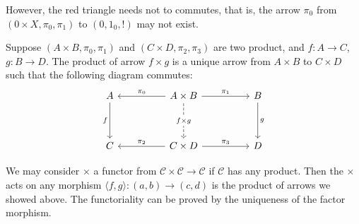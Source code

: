 \documentclass[./main.tex]{subfiles}
\begin{document}
However, the red triangle needs not to commutes, that is,
the arrow $\pi_0$ from $(0 \times X, \pi_0, \pi_1)$ to $(0, 1_0, !)$
may not exist.

\begin{definition}
  Suppose $(A \times B, \pi_0, \pi_1)$ and $(C \times D, \pi_2, \pi_3)$ are two product, and
  $f : A \rightarrow C$, $g : B \rightarrow D$.
  The product of arrow $f \times g$ is a unique arrow from $A \times B$ to $C \times D$
  such that the following diagram commutes:
  \[\begin{tikzcd}
	A && {A \times B} && B \\
	\\
	C && {C \times D} && D
	\arrow["f"', from=1-1, to=3-1]
	\arrow["{\pi_0}"', from=1-3, to=1-1]
	\arrow["{\pi_1}", from=1-3, to=1-5]
	\arrow["{f \times g}"{description}, dashed, from=1-3, to=3-3]
	\arrow["g", from=1-5, to=3-5]
	\arrow["{\pi_2}"', from=3-3, to=3-1]
	\arrow["{\pi_3}", from=3-3, to=3-5]
\end{tikzcd}\]
\end{definition}

We may consider $\times$ a functor from $\mathcal{C} \times \mathcal{C} \rightarrow \mathcal{C}$
if $\mathcal{C}$ has any product. Then the $\times$ acts on any morphism $\langle f, g \rangle : (a, b) \rightarrow (c, d)$
is the product of arrows we showed above. The functoriality can be proved by
the uniqueness of the factor morphism.
\end{document}
